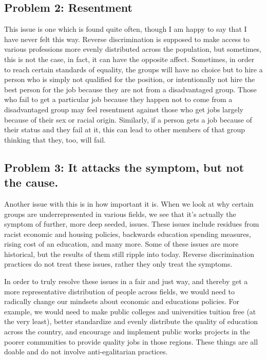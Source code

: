 \subsection{Problem 2: Resentment}

This issue is one which is found quite often, though I am happy to say that I have never felt this way. Reverse discrimination is supposed to make access to various professions more evenly distributed across the population, but sometimes, this is not the case, in fact, it can have the opposite affect. Sometimes, in order to reach certain standards of equality, the groups will have no choice but to hire a person who is simply not qualified for the position, or intentionally not hire the best person for the job because they are not from a disadvantaged group. Those who fail to get a particular job because they happen not to come from a disadvantaged group may feel resentment against those who get jobs largely because of their sex or racial origin. Similarly, if a person gets a job because of their status and they fail at it, this can lead to other members of that group thinking that they, too, will fail.
\subsection{Problem 3: It attacks the symptom, but not the cause.}

Another issue with this is in how important it is. When we look at why certain groups are underrepresented in various fields, we see that it's actually the symptom of further, more deep seeded, issues. These issues include residues from racist economic and housing policies, backwards education spending measures, rising cost of an education, and many more. Some of these issues are more historical, but the results of them still ripple into today. Reverse discrimination practices do not treat these issues, rather they only treat the symptoms.

In order to truly resolve these issues in a fair and just way, and thereby get a more representative distribution of people across fields, we would need to radically change our mindsets about economic and educations policies. For example, we would need to make public colleges and universities tuition free (at the very least), better standardize and evenly distribute the quality of education across the country, and encourage and implement public works projects in the poorer communities to provide quality jobs in those regions. These things are all doable and do not involve anti-egalitarian practices.

